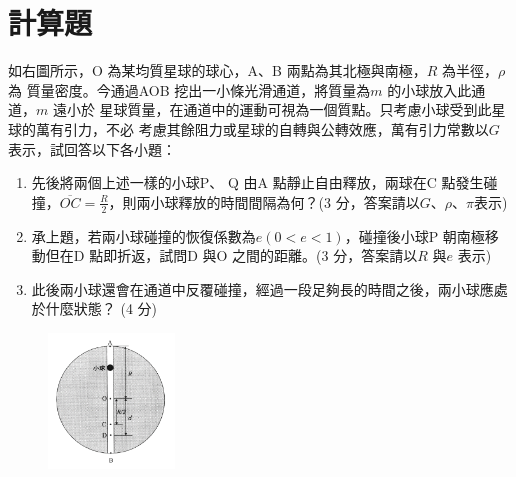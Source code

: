 \documentclass[cn,10pt,math=newtx,chinesefont=founder,device=ig]{elegantbook}
\begin{document}
\section{計算題}



\begin{example}
如右圖所示，O 為某均質星球的球心，A、B 兩點為其北極與南極，$R$ 為半徑，$\rho$為
質量密度。今通過AOB 挖出一小條光滑通道，將質量為$m$ 的小球放入此通道，$m$ 遠小於
星球質量，在通道中的運動可視為一個質點。只考慮小球受到此星球的萬有引力，不必
考慮其餘阻力或星球的自轉與公轉效應，萬有引力常數以$G$ 表示，試回答以下各小題：
\begin{enumerate}[label=(\arabic*)] 
  \item 先後將兩個上述一樣的小球P、 Q 由A 點靜止自由釋放，兩球在C 點發生碰撞，$\overline{OC} = \frac{R}{2}$，則兩小球釋放的時間間隔為何？(3 分，答案請以$G、\rho、\pi $表示)
  \item 承上題，若兩小球碰撞的恢復係數為$e (0< e <1)$，碰撞後小球P 朝南極移動但在D 點即折返，試問D 與O 之間的距離。(3 分，答案請以$R$ 與$e$ 表示)
  \item 此後兩小球還會在通道中反覆碰撞，經過一段足夠長的時間之後，兩小球應處於什麼狀態？ (4 分)
    \end{enumerate}
    \rightline{[台中女中教甄109]}
\end{example}
\begin{solution}
    
\end{solution}
\begin{figure}[htbp]
    \flushright
    \includegraphics[width=0.3\textwidth]{image/109中女21.png}
  \end{figure}
\newpage
\end{document}
